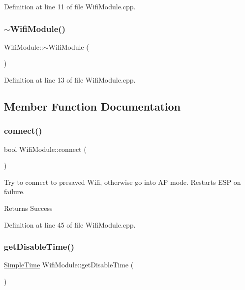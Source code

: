 Definition at line 11 of file Wifi\+Module.\+cpp.

\mbox{\label{class_wifi_module_a13508027d6d44f9ad4adc916a142c4e4}} 
\subsubsection{\texorpdfstring{$\sim$WifiModule()}{~WifiModule()}}
{\footnotesize\ttfamily Wifi\+Module\+::$\sim$\+Wifi\+Module (\begin{DoxyParamCaption}{ }\end{DoxyParamCaption})}



Definition at line 13 of file Wifi\+Module.\+cpp.



\subsection{Member Function Documentation}
\mbox{\label{class_wifi_module_a408a6374602360051d2791de4f56b067}} 
\subsubsection{\texorpdfstring{connect()}{connect()}}
{\footnotesize\ttfamily bool Wifi\+Module\+::connect (\begin{DoxyParamCaption}{ }\end{DoxyParamCaption})}

Try to connect to presaved Wifi, otherwise go into AP mode. Restarts E\+SP on failure. \begin{DoxyReturn}{Returns}
Success 
\end{DoxyReturn}


Definition at line 45 of file Wifi\+Module.\+cpp.

\mbox{\label{class_wifi_module_ae43e1f85630c40920fa87c12de0d8e1e}} 
\subsubsection{\texorpdfstring{getDisableTime()}{getDisableTime()}}
{\footnotesize\ttfamily \mbox{\hyperlink{class_simple_time}{Simple\+Time}} Wifi\+Module\+::get\+Disable\+Time (\begin{DoxyParamCaption}{ }\end{DoxyParamCaption})}

